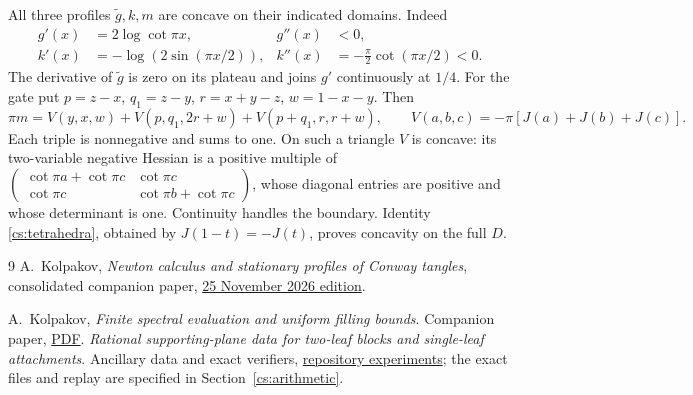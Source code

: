 \documentclass[11pt]{article}
\theoremstyle{remark}\newtheorem{remark}[theorem]{Remark}
\numberwithin{equation}{section}
\begin{document}
All three profiles $\widetilde g,k,m$ are concave on their indicated domains. Indeed
\[
\begin{aligned}
 g'(x)&=2\log\cot\pi x,&g''(x)&<0,\\
 k'(x)&=-\log(2\sin(\pi x/2)),&
 k''(x)&=-\frac\pi2\cot(\pi x/2)<0.
\end{aligned}
\]
The derivative of $\widetilde g$ is zero on its plateau and joins $g'$ continuously at $1/4$. For the gate put $p=z-x$, $q_1=z-y$, $r=x+y-z$, $w=1-x-y$. Then
\begin{equation}\label{cs:tetrahedra}
 \pi m=V(y,x,w)+V(p,q_1,2r+w)+V(p+q_1,r,r+w),
 \qquad V(a,b,c)=-\pi[J(a)+J(b)+J(c)].
\end{equation}
Each triple is nonnegative and sums to one. On such a triangle $V$ is concave: its two-variable negative Hessian is a positive multiple of
$\left(\begin{smallmatrix}\cot\pi a+\cot\pi c&\cot\pi c\\\cot\pi c&\cot\pi b+\cot\pi c\end{smallmatrix}\right)$, whose diagonal entries are positive and whose determinant is one. Continuity handles the boundary. Identity \eqref{cs:tetrahedra}, obtained by $J(1-t)=-J(t)$, proves concavity on the full $D$.





\FloatBarrier






\begin{thebibliography}{9}
A.~Kolpakov, \emph{Newton calculus and stationary profiles of Conway tangles},
consolidated companion paper,
\href{https://github.com/sashakolpakov/murakamis_dream/blob/conway-series-2026-11-25/docs/papers/newton-calculus.pdf}{25 November 2026 edition}.

A.~Kolpakov, \emph{Finite spectral evaluation and uniform filling bounds}.
Companion paper, \href{https://github.com/sashakolpakov/murakamis_dream/blob/conway-series-2026-11-25/docs/papers/filling-bounds.pdf}{PDF}.
\emph{Rational supporting-plane data for two-leaf blocks and single-leaf attachments}.
Ancillary data and exact verifiers, \href{https://github.com/sashakolpakov/murakamis_dream/tree/main/experiments}{repository experiments}; the exact files and replay are specified in Section~\ref{cs:arithmetic}.
\end{thebibliography}
\end{document}
